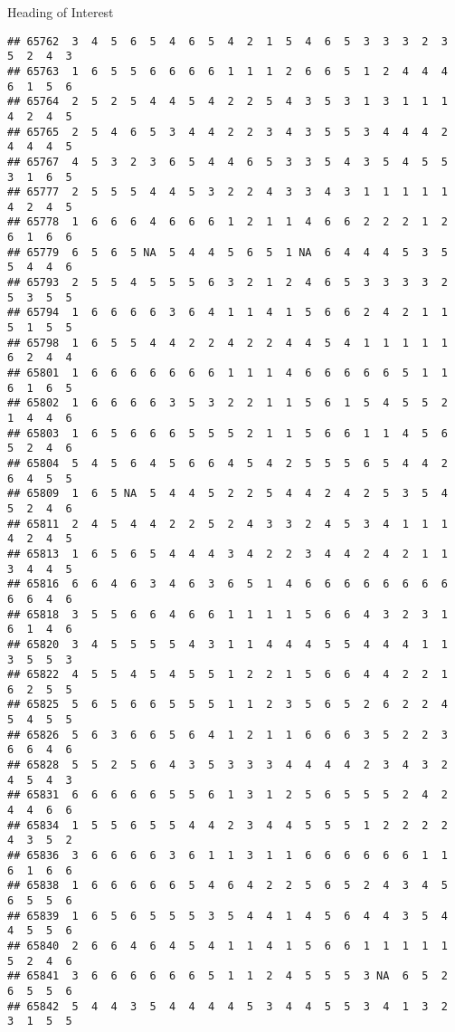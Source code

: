 \documentclass[
  ignorenonframetext,
]{beamer}
\begin{document}
\begin{frame}[fragile]{Heading of Interest}
\begin{verbatim}
## 65762  3  4  5  6  5  4  6  5  4  2  1  5  4  6  5  3  3  3  2  3  5  2  4  3
## 65763  1  6  5  5  6  6  6  6  1  1  1  2  6  6  5  1  2  4  4  4  6  1  5  6
## 65764  2  5  2  5  4  4  5  4  2  2  5  4  3  5  3  1  3  1  1  1  4  2  4  5
## 65765  2  5  4  6  5  3  4  4  2  2  3  4  3  5  5  3  4  4  4  2  4  4  4  5
## 65767  4  5  3  2  3  6  5  4  4  6  5  3  3  5  4  3  5  4  5  5  3  1  6  5
## 65777  2  5  5  5  4  4  5  3  2  2  4  3  3  4  3  1  1  1  1  1  4  2  4  5
## 65778  1  6  6  6  4  6  6  6  1  2  1  1  4  6  6  2  2  2  1  2  6  1  6  6
## 65779  6  5  6  5 NA  5  4  4  5  6  5  1 NA  6  4  4  4  5  3  5  5  4  4  6
## 65793  2  5  5  4  5  5  5  6  3  2  1  2  4  6  5  3  3  3  3  2  5  3  5  5
## 65794  1  6  6  6  6  3  6  4  1  1  4  1  5  6  6  2  4  2  1  1  5  1  5  5
## 65798  1  6  5  5  4  4  2  2  4  2  2  4  4  5  4  1  1  1  1  1  6  2  4  4
## 65801  1  6  6  6  6  6  6  6  1  1  1  4  6  6  6  6  6  5  1  1  6  1  6  5
## 65802  1  6  6  6  6  3  5  3  2  2  1  1  5  6  1  5  4  5  5  2  1  4  4  6
## 65803  1  6  5  6  6  6  5  5  5  2  1  1  5  6  6  1  1  4  5  6  5  2  4  6
## 65804  5  4  5  6  4  5  6  6  4  5  4  2  5  5  5  6  5  4  4  2  6  4  5  5
## 65809  1  6  5 NA  5  4  4  5  2  2  5  4  4  2  4  2  5  3  5  4  5  2  4  6
## 65811  2  4  5  4  4  2  2  5  2  4  3  3  2  4  5  3  4  1  1  1  4  2  4  5
## 65813  1  6  5  6  5  4  4  4  3  4  2  2  3  4  4  2  4  2  1  1  3  4  4  5
## 65816  6  6  4  6  3  4  6  3  6  5  1  4  6  6  6  6  6  6  6  6  6  6  4  6
## 65818  3  5  5  6  6  4  6  6  1  1  1  1  5  6  6  4  3  2  3  1  6  1  4  6
## 65820  3  4  5  5  5  5  4  3  1  1  4  4  4  5  5  4  4  4  1  1  3  5  5  3
## 65822  4  5  5  4  5  4  5  5  1  2  2  1  5  6  6  4  4  2  2  1  6  2  5  5
## 65825  5  6  5  6  6  5  5  5  1  1  2  3  5  6  5  2  6  2  2  4  5  4  5  5
## 65826  5  6  3  6  6  5  6  4  1  2  1  1  6  6  6  3  5  2  2  3  6  6  4  6
## 65828  5  5  2  5  6  4  3  5  3  3  3  4  4  4  4  2  3  4  3  2  4  5  4  3
## 65831  6  6  6  6  6  5  5  6  1  3  1  2  5  6  5  5  5  2  4  2  4  4  6  6
## 65834  1  5  5  6  5  5  4  4  2  3  4  4  5  5  5  1  2  2  2  2  4  3  5  2
## 65836  3  6  6  6  6  3  6  1  1  3  1  1  6  6  6  6  6  6  1  1  6  1  6  6
## 65838  1  6  6  6  6  6  5  4  6  4  2  2  5  6  5  2  4  3  4  5  6  5  5  6
## 65839  1  6  5  6  5  5  5  3  5  4  4  1  4  5  6  4  4  3  5  4  4  5  5  6
## 65840  2  6  6  4  6  4  5  4  1  1  4  1  5  6  6  1  1  1  1  1  5  2  4  6
## 65841  3  6  6  6  6  6  6  5  1  1  2  4  5  5  5  3 NA  6  5  2  6  5  5  6
## 65842  5  4  4  3  5  4  4  4  4  5  3  4  4  5  5  3  4  1  3  2  3  1  5  5

\end{verbatim}
\end{frame}
\end{document}
